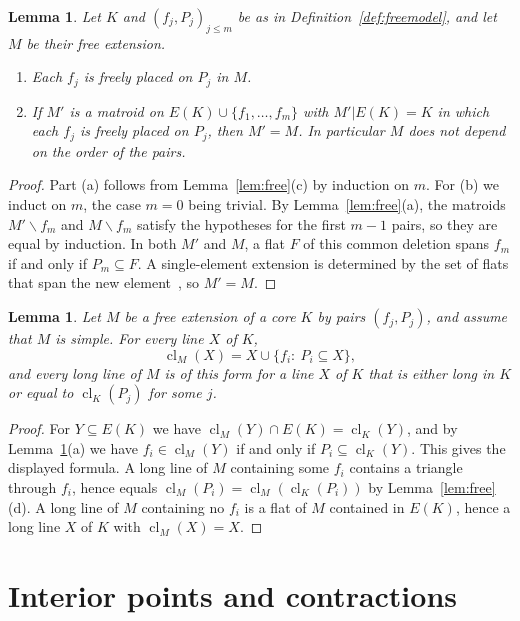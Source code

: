 \documentclass[11pt]{amsart}
\newtheorem{lemma}[theorem]{Lemma}
\theoremstyle{definition}
\theoremstyle{remark}
\numberwithin{equation}{section}
\newcommand{\cl}{\operatorname{cl}}
\begin{document}
\begin{lemma}\label{lem:unique}
Let $K$ and $(f_j,P_j)_{j\le m}$ be as in Definition~\ref{def:freemodel}, and let $M$ be their free extension.
\begin{enumerate}[label=\textup{(\alph*)}]
\item Each $f_j$ is freely placed on $P_j$ in $M$.
\item If $M'$ is a matroid on $E(K)\cup\{f_1,\dots,f_m\}$ with $M'|E(K)=K$ in which each $f_j$ is freely placed on $P_j$, then $M'=M$. In particular $M$ does not depend on the order of the pairs.
\end{enumerate}
\end{lemma}

\begin{proof}
Part (a) follows from Lemma~\ref{lem:free}(c) by induction on $m$. For (b) we induct on $m$, the case $m=0$ being trivial. By Lemma~\ref{lem:free}(a), the matroids $M'\backslash f_m$ and $M\backslash f_m$ satisfy the hypotheses for the first $m-1$ pairs, so they are equal by induction. In both $M'$ and $M$, a flat $F$ of this common deletion spans $f_m$ if and only if $P_m\subseteq F$. A single-element extension is determined by the set of flats that span the new element~\cite[Section~7.2]{Oxl11}, so $M'=M$.
\end{proof}

\begin{lemma}\label{lem:triangles}
Let $M$ be a free extension of a core $K$ by pairs $(f_j,P_j)$, and assume that $M$ is simple. For every line $X$ of $K$,
\[
\cl_M(X)=X\cup\{f_i:\ P_i\subseteq X\},
\]
and every long line of $M$ is of this form for a line $X$ of $K$ that is either long in $K$ or equal to $\cl_K(P_j)$ for some $j$.
\end{lemma}

\begin{proof}
For $Y\subseteq E(K)$ we have $\cl_M(Y)\cap E(K)=\cl_K(Y)$, and by Lemma~\ref{lem:unique}(a) we have $f_i\in\cl_M(Y)$ if and only if $P_i\subseteq\cl_K(Y)$. This gives the displayed formula. A long line of $M$ containing some $f_i$ contains a triangle through $f_i$, hence equals $\cl_M(P_i)=\cl_M(\cl_K(P_i))$ by Lemma~\ref{lem:free}(d). A long line of $M$ containing no $f_i$ is a flat of $M$ contained in $E(K)$, hence a long line $X$ of $K$ with $\cl_M(X)=X$.
\end{proof}

\section{Interior points and contractions}\label{sec:interiors}
\end{document}
